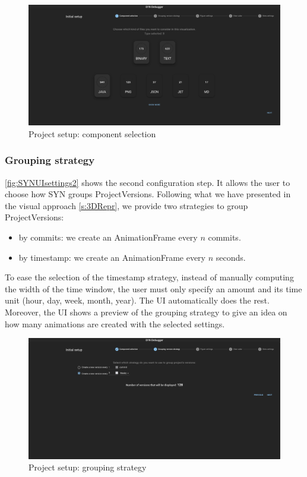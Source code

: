 \begin{figure}
    \center
    \includegraphics[width=\textwidth]{SYNUI-settings1.png}
    \caption{Project setup: component selection}
    \label{fig:SYNUIsettings1}
\end{figure}


\subsubsection*{Grouping strategy}
\autoref{fig:SYNUIsettings2} shows the second configuration step. It allows the user to choose how SYN groups ProjectVersions. 
Following what we have presented in the visual approach \autoref{s:3DRepr}, we provide two strategies to group ProjectVersions:
\begin{itemize}
    \item by commits: we create an AnimationFrame every $n$ commits. 
    \item by timestamp: we create an AnimationFrame every $n$ seconds. 
\end{itemize}

To ease the selection of the timestamp strategy, instead of manually computing the width of the time window, the user must only specify an amount and its time unit (hour, day, week, month, year). The UI automatically does the rest. 
Moreover, the UI shows a preview of the grouping strategy to give an idea on how many animations are created with the selected settings. 
\begin{figure}
    \center
    \includegraphics[width=\textwidth]{SYNUI-settings2.png}
    \caption{Project setup: grouping strategy}
    \label{fig:SYNUIsettings2}
\end{figure}

